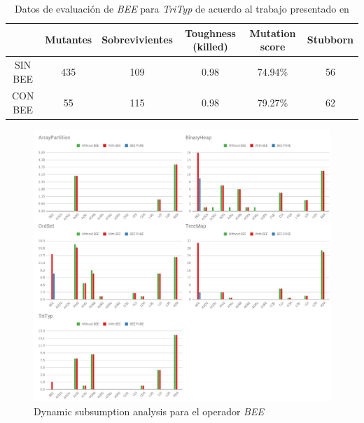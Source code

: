 \begin{table}[]
	\centering
	\scriptsize
	\def\arraystretch{0.95}
	\setlength\tabcolsep{0.5mm}
	\begin{tabular}{c|ccccc|}
		\cline{2-6}
		& Mutantes & Sobrevivientes & Toughness (killed) & Mutation score & Stubborn \\ \hline
		\multicolumn{1}{|c|}{SIN BEE} & 435 & 109 & 0.98 & 74.94\% & 56 \\ \hline
		\multicolumn{1}{|c|}{CON BEE} & 55 & 115 & 0.98 & 79.27\% & 62 \\ \hline
	\end{tabular}
	\caption{Datos de evaluaci\'on de \emph{BEE} para \emph{TriTyp} de acuerdo al trabajo presentado en \cite{bibliography.mutation.operators.beeBridaS17}}
	\label{tables.examples.bee.paperResults.trityp}
\end{table}

\begin{figure}[t]
	\begin{center}
		\includegraphics[width=12cm]{figures/BEETables.png}
	\end{center}
	\caption{Dynamic subsumption analysis para el operador \emph{BEE}}
	\label{subsumption-results-bee}
\end{figure}